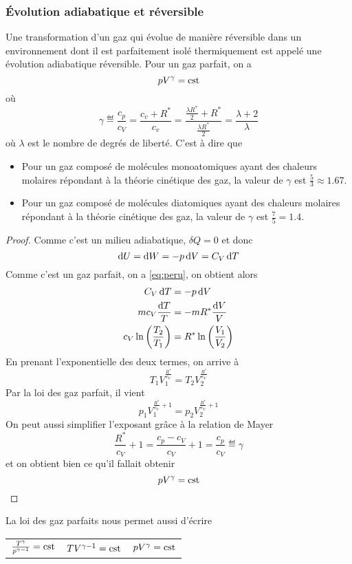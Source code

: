 \subsubsection{Évolution adiabatique et réversible}
Une transformation d'un gaz qui évolue de manière réversible dans
un environnement dont il est parfaitement isolé thermiquement est
appelé une évolution adiabatique réversible.
Pour un gaz parfait, on a
\[ pV^{\gamma} = \mathrm{cst} \]
où
\[ \gamma \eqdef \frac{c_p}{c_V} = \frac{c_v+R^*}{c_v}
  = \frac{\frac{\lambda R^*}{2}+R^*}{\frac{\lambda R^*}{2}}
  = \frac{\lambda + 2}{\lambda} \]
où $\lambda$ est le nombre de degrés de liberté.
C'est à dire que
\begin{itemize}
  \item Pour un gaz composé de molécules monoatomiques
    ayant des chaleurs molaires répondant à la théorie cinétique des gaz,
    la valeur de $\gamma$ est $\frac{5}{3} \approx \si{1.67}{}$.
  \item Pour un gaz composé de molécules diatomiques
    ayant des chaleurs molaires répondant à la théorie cinétique des gaz,
    la valeur de $\gamma$ est $\frac{7}{5} = \si{1.4}{}$.
\end{itemize}
\begin{proof}
  Comme c'est un milieu adiabatique, $\delta Q = 0$ et donc
  \[ \operatorname{d}\! U = \operatorname{d}\! W = -p\operatorname{d}\! V = C_V\operatorname{d}\! T \]
  Comme c'est un gaz parfait, on a \eqref{eq:peru}, on obtient alors
  \begin{align*}
    C_V \operatorname{d}\! T & = -p \operatorname{d}\! V\\
    mc_{V}\frac{\operatorname{d}\! T}{T} & = -mR^*\frac{\operatorname{d}\! V}{V}\\
    c_{V} \ln\left(\frac{T_2}{T_1}\right) & =
    R^* \ln\left(\frac{V_1}{V_2}\right)
  \end{align*}
  En prenant l'exponentielle des deux termes, on arrive à
  \[ T_1V_1^{\frac{R^*}{c_{V}}} = T_2V_2^{\frac{R^*}{c_{V}}} \]
  Par la loi des gaz parfait, il vient
  \[ p_1V_1^{\frac{R^*}{c_{V}}+1} = p_2V_2^{\frac{R^*}{c_{V}}+1} \]
  On peut aussi simplifier l'exposant grâce à la relation de Mayer
  \[ \frac{R^*}{c_{V}}+1 = \frac{c_{p}-c_{V}}{c_{V}}+1 =
  \frac{c_{p}}{c_{V}} \eqdef \gamma \]
  et on obtient bien ce qu'il fallait obtenir
  \[ pV^{\gamma} = \mathrm{cst} \]
\end{proof}
La loi des gaz parfaits nous permet aussi d'écrire
\begin{center}
  \begin{tabular}{p{}p{}p{}}
    \centering$\frac{T^\gamma}{p^{\gamma-1}} = \mathrm{cst}$ &
    \centering$TV^{\gamma-1} = \mathrm{cst}$ &
    \centering$pV^\gamma = \mathrm{cst}$
  \end{tabular}
\end{center}

